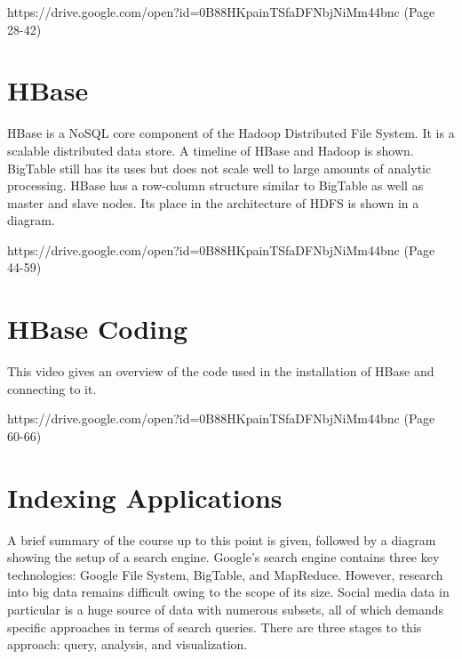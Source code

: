
{https://drive.google.com/open?id=0B88HKpainTSfaDFNbjNiMm44bnc
  (Page 28-42)}

\section{HBase}

HBase is a NoSQL core component of the Hadoop Distributed File System.
It is a scalable distributed data store. A timeline of HBase and Hadoop
is shown. BigTable still has its uses but does not scale well to large
amounts of analytic processing. HBase has a row-column structure similar
to BigTable as well as master and slave nodes. Its place in the
architecture of HDFS is shown in a diagram.


{https://drive.google.com/open?id=0B88HKpainTSfaDFNbjNiMm44bnc
  (Page 44-59)}

\section{HBase Coding}

This video gives an overview of the code used in the installation of
HBase and connecting to it.


{https://drive.google.com/open?id=0B88HKpainTSfaDFNbjNiMm44bnc
  (Page 60-66)}

\section{Indexing Applications}

A brief summary of the course up to this point is given, followed by a
diagram showing the setup of a search engine. Google's search engine
contains three key technologies: Google File System, BigTable, and
MapReduce. However, research into big data remains difficult owing to
the scope of its size. Social media data in particular is a huge source
of data with numerous subsets, all of which demands specific approaches
in terms of search queries. There are three stages to this approach:
query, analysis, and visualization.


